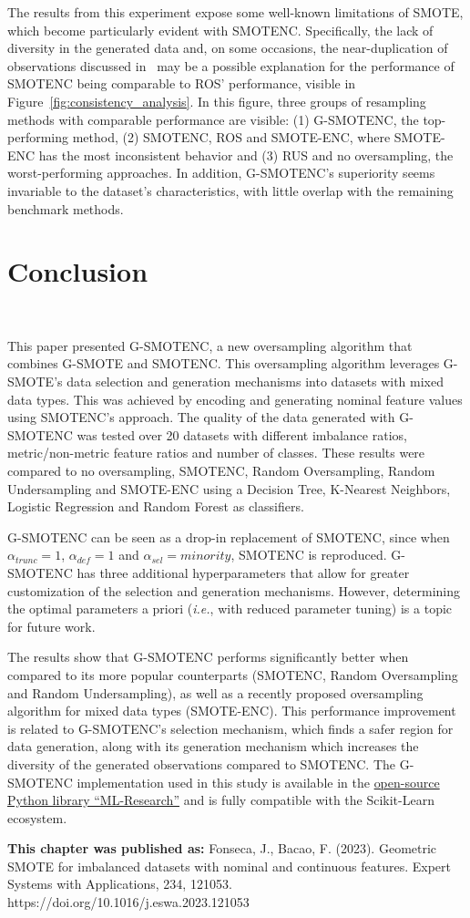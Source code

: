 The results from this experiment expose some well-known limitations of SMOTE,
which become particularly evident with SMOTENC. Specifically, the lack of
diversity in the generated data and, on some occasions, the near-duplication
of observations discussed in~\cite{Douzas2019} may be a possible
explanation for the performance of SMOTENC being comparable to ROS'
performance, visible in Figure~\ref{fig:consistency_analysis}. In this
figure, three groups of resampling methods with comparable performance are
visible: (1) G-SMOTENC, the top-performing method, (2) SMOTENC, ROS and
SMOTE-ENC, where SMOTE-ENC has the most inconsistent behavior and (3) RUS and
no oversampling, the worst-performing approaches. In addition, G-SMOTENC's
superiority seems invariable to the dataset's characteristics, with little
overlap with the remaining benchmark methods.

\section{Conclusion}~\label{sec:conclusion-gsmotenc}

This paper presented G-SMOTENC, a new oversampling algorithm that combines
G-SMOTE and SMOTENC. This oversampling algorithm leverages G-SMOTE's data
selection and generation mechanisms into datasets with mixed data types. This
was achieved by encoding and generating nominal feature values using SMOTENC's
approach. The quality of the data generated with G-SMOTENC was tested over 20
datasets with different imbalance ratios, metric/non-metric feature ratios
and number of classes. These results were compared to no oversampling,
SMOTENC, Random Oversampling, Random Undersampling and SMOTE-ENC using a
Decision Tree, K-Nearest Neighbors, Logistic Regression and Random Forest as
classifiers.

G-SMOTENC can be seen as a drop-in replacement of SMOTENC, since when
$\alpha_{trunc}=1$, $\alpha_{def}=1$ and $\alpha_{sel}=minority$, SMOTENC is
reproduced. G-SMOTENC has three additional hyperparameters that allow for
greater customization of the selection and generation mechanisms.  However,
determining the optimal parameters a priori (\textit{i.e.}, with reduced
parameter tuning) is a topic for future work.

The results show that G-SMOTENC performs significantly better when compared to
its more popular counterparts (SMOTENC, Random Oversampling and Random
Undersampling), as well as a recently proposed oversampling algorithm for
mixed data types (SMOTE-ENC). This performance improvement is related to
G-SMOTENC's selection mechanism, which finds a safer region for data
generation, along with its generation mechanism which increases the diversity
of the generated observations compared to SMOTENC. The G-SMOTENC
implementation used in this study is available in the
\href{https://github.com/joaopfonseca/ml-research}{open-source Python library
``ML-Research''} and is fully compatible with the Scikit-Learn ecosystem.

\textbf{This chapter was published as:} Fonseca, J., Bacao, F. (2023).
Geometric SMOTE for imbalanced datasets with nominal and continuous features.
Expert Systems with Applications, 234, 121053.
https://doi.org/10.1016/j.eswa.2023.121053
